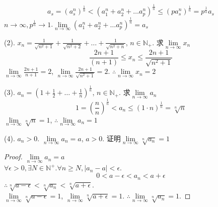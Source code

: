	\begin{equation*}\label{ex2.2.4Ex2}
		a_s = (a_s^n)^\frac{1}{n}
		<
		(a_1^n+a_2^n+\dots a_p^n)^\frac{1}{n}
		\leqslant
		(p a_s^n)^\frac{1}{n}=p^\frac{1}{n}a_s
	\end{equation*}
$ n\rightarrow\infty, p^\frac{1}{n}\rightarrow 1 $.$ \lim\limits_{n\rightarrow\infty}(a_1^n+a_2^n+\dots a_p^n)^\frac{1}{n} = a_s $

(2). $ x_n= \frac{1}{\sqrt{n^2+1}}+\frac{1}{\sqrt{n^2+2}}+\dots+\frac{1}{\sqrt{n^2+n}} $, $ n\in \mathbb{N}_+ $. 求$ \lim\limits_{n\rightarrow\infty} x_n $
\begin{equation*}
	\frac{2n+1}{(n+1)}\leqslant x_n\leqslant \frac{2n+1}{\sqrt{n^2+1}}
\end{equation*}
$ \lim\limits_{n\rightarrow\infty}\frac{2n+1}{n+1}=2 $, 
$ \lim\limits_{n\rightarrow\infty}\frac{2n+1}{\sqrt{n^2+1}}=2 $.
$ \therefore \lim\limits_{n\rightarrow\infty} x_n = 2 $

(3). $ a_n = (1+\frac{1}{2}+\dots+\frac{1}{n})^{\frac{1}{n}} $, $ n\in\mathbb{N}_+ $. 求$ \lim\limits_{n\rightarrow\infty}a_n $
	\begin{equation*}
		1=(\frac{n}{n})^\frac{1}{n} < a_n \leqslant (1\cdot n)^\frac{1}{n}=\sqrt[n]{n}
	\end{equation*}
$ \lim\limits_{n\rightarrow\infty} \sqrt[n]{n}=1 $, $ \therefore \lim\limits_{n\rightarrow\infty} a_n = 1$

(4). $ a_n>0 $. $ \lim\limits_{n\rightarrow\infty}a_n = a $, $ a>0 $. 证明$ \lim\limits_{n\rightarrow\infty} \sqrt[n]{a_n}=1 $
\begin{proof}
$ \lim\limits_{n\rightarrow\infty}a_n = a $\\
$\forall \epsilon >0, \exists N \in \mathbb{N}^+. \forall n \geqslant N, |a_n-a| < \epsilon$.
\begin{equation*}
	0<a-\epsilon<a_n<a+\epsilon
\end{equation*}
$ \therefore \sqrt[n]{a-\epsilon}<\sqrt[n]{a_n}<\sqrt[n]{a+\epsilon} $.\\
$ \lim\limits_{n\rightarrow\infty}\sqrt[n]{a-\epsilon} = 1 $,
$ \lim\limits_{n\rightarrow\infty}\sqrt[n]{a+\epsilon} = 1 $. $ \therefore  \lim\limits_{n\rightarrow\infty}\sqrt[n]{a_n} = 1  $.
\end{proof}

